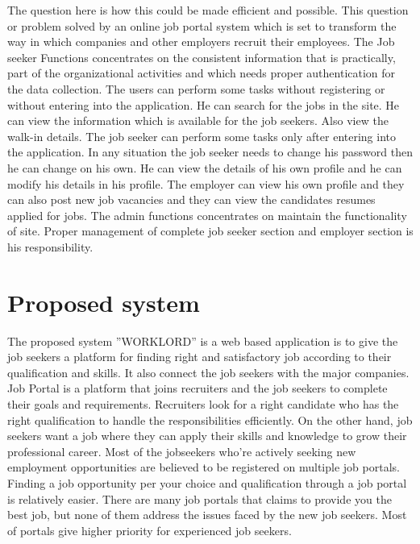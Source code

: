 \documentclass[a4paper,12pt]{report}
\begin{document}
The question here is how this could be made efficient and possible. This question or problem solved by an online job portal system which is set to transform the way in which companies and other employers recruit their employees. The Job seeker Functions concentrates on the consistent information that is practically, part of the organizational activities and which needs proper authentication for the data collection. The users can perform some tasks without registering or without entering into the application. He can search for the jobs in the site. He can view the information which is available for the job seekers. Also view the walk-in details. The job seeker can perform some tasks only after entering into the application. In any situation the job seeker needs to change his password then he can change on his own. He can view the details of his own profile and he can modify his details in his profile. The employer can view his own profile and they can also post new job vacancies and they can view the candidates resumes applied for jobs. The admin functions concentrates on maintain the functionality of site. Proper management of complete job seeker section and employer section is his responsibility.\\

\section{Proposed system}
\hspace*{12pt}
The proposed system ”WORKLORD” is a web based application is to give the job seekers a platform for finding right and satisfactory job according to their qualification and skills. It also connect the job seekers with the major companies. Job Portal is a platform that joins recruiters and the job seekers to complete their goals and requirements. Recruiters look for a right candidate who has the right qualification to handle the responsibilities efficiently. On the other  hand, job seekers want a job where they can apply their skills and knowledge to grow their professional career. Most of the jobseekers who're actively seeking new employment opportunities are believed to be registered on multiple job portals. Finding a job opportunity per your choice and qualification through a job portal is relatively easier. There are many job portals that claims to provide you the best job, but none of them address the issues faced by the new job seekers. Most of portals give higher priority for experienced job seekers.\\
\end{document}

